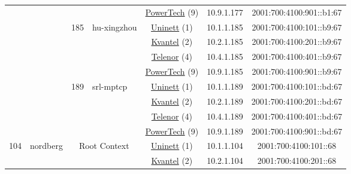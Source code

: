 \begin{small}
\begin{center}
\begin{longtable}{|c|c|c|c|c|c|c|c|}
  &  &  &  & \multicolumn{2}{|c|}{\tiny{\href{http://www.powertech.no}{PowerTech} (9)}} & \tiny{10.9.1.177} & \tiny{2001:700:4100:901::b1:67} \\* \cline{3-3}\cline{4-4}\cline{5-5}\cline{6-6}\cline{7-7}\cline{8-8}
  &  & \multirow{4}{*}{\tiny{185}} & \multicolumn{1}{|l|}{\multirow{4}{*}{\tiny{hu-xingzhou}}} & \multicolumn{2}{|c|}{\tiny{\href{https://www.uninett.no}{Uninett} (1)}} & \tiny{10.1.1.185} & \tiny{2001:700:4100:101::b9:67} \\* \cline{5-5}\cline{6-6}\cline{7-7}\cline{8-8}
  &  &  &  & \multicolumn{2}{|c|}{\tiny{\href{http://kvantel.no}{Kvantel} (2)}} & \tiny{10.2.1.185} & \tiny{2001:700:4100:201::b9:67} \\* \cline{5-5}\cline{6-6}\cline{7-7}\cline{8-8}
  &  &  &  & \multicolumn{2}{|c|}{\tiny{\href{https://www.telenor.no}{Telenor} (4)}} & \tiny{10.4.1.185} & \tiny{2001:700:4100:401::b9:67} \\* \cline{5-5}\cline{6-6}\cline{7-7}\cline{8-8}
  &  &  &  & \multicolumn{2}{|c|}{\tiny{\href{http://www.powertech.no}{PowerTech} (9)}} & \tiny{10.9.1.185} & \tiny{2001:700:4100:901::b9:67} \\* \cline{3-3}\cline{4-4}\cline{5-5}\cline{6-6}\cline{7-7}\cline{8-8}
  &  & \multirow{4}{*}{\tiny{189}} & \multicolumn{1}{|l|}{\multirow{4}{*}{\tiny{srl-mptcp}}} & \multicolumn{2}{|c|}{\tiny{\href{https://www.uninett.no}{Uninett} (1)}} & \tiny{10.1.1.189} & \tiny{2001:700:4100:101::bd:67} \\* \cline{5-5}\cline{6-6}\cline{7-7}\cline{8-8}
  &  &  &  & \multicolumn{2}{|c|}{\tiny{\href{http://kvantel.no}{Kvantel} (2)}} & \tiny{10.2.1.189} & \tiny{2001:700:4100:201::bd:67} \\* \cline{5-5}\cline{6-6}\cline{7-7}\cline{8-8}
  &  &  &  & \multicolumn{2}{|c|}{\tiny{\href{https://www.telenor.no}{Telenor} (4)}} & \tiny{10.4.1.189} & \tiny{2001:700:4100:401::bd:67} \\* \cline{5-5}\cline{6-6}\cline{7-7}\cline{8-8}
  &  &  &  & \multicolumn{2}{|c|}{\tiny{\href{http://www.powertech.no}{PowerTech} (9)}} & \tiny{10.9.1.189} & \tiny{2001:700:4100:901::bd:67} \\ \hline
 \multirow{32}{*}{\tiny{104}} & \multicolumn{1}{|l|}{\multirow{32}{*}{\tiny{nordberg}}} & \multicolumn{2}{|c|}{\multirow{4}{*}{\tiny{Root Context}}} & \multicolumn{2}{|c|}{\tiny{\href{https://www.uninett.no}{Uninett} (1)}} & \tiny{10.1.1.104} & \tiny{2001:700:4100:101::68} \\* \cline{5-5}\cline{6-6}\cline{7-7}\cline{8-8}
  &  & \multicolumn{2}{|c|}{} & \multicolumn{2}{|c|}{\tiny{\href{http://kvantel.no}{Kvantel} (2)}} & \tiny{10.2.1.104} & \tiny{2001:700:4100:201::68} \\* \cline{5-5}\cline{6-6}\cline{7-7}\cline{8-8}

\end{longtable}
\end{center}
\end{small}
